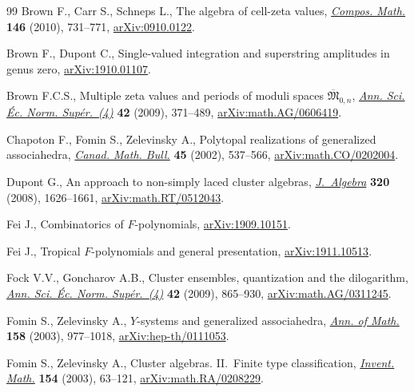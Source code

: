 \documentclass[10pt,a4paper]{amsart}
\numberwithin{equation}{section}
\begin{document}
\begin{thebibliography}{99}
Brown F., Carr S., Schneps L., The algebra of cell-zeta values, \href{https://doi.org/10.1112/S0010437X09004540}{\textit{Compos.
 Math.}} \textbf{146} (2010), 731--771, \href{https://arxiv.org/abs/0910.0122}{arXiv:0910.0122}.

Brown F., Dupont C., Single-valued integration and superstring amplitudes in
 genus zero, \href{https://arxiv.org/abs/1910.01107}{arXiv:1910.01107}.

Brown F.C.S., Multiple zeta values and periods of moduli spaces
 {$\overline{\mathfrak M}_{0,n}$}, \href{https://doi.org/10.24033/asens.2099}{\textit{Ann. Sci. \'Ec. Norm. Sup\'er.~(4)}}
 \textbf{42} (2009), 371--489, \href{https://arxiv.org/abs/math.AG/0606419}{arXiv:math.AG/0606419}.

Chapoton F., Fomin S., Zelevinsky A., Polytopal realizations of generalized
 associahedra, \href{https://doi.org/10.4153/CMB-2002-054-1}{\textit{Canad. Math. Bull.}} \textbf{45} (2002), 537--566, \href{https://arxiv.org/abs/math.CO/0202004}{arXiv:math.CO/0202004}.

Dupont G., An approach to non-simply laced cluster algebras,
 \href{https://doi.org/10.1016/j.jalgebra.2008.03.018}{\textit{J.~Algebra}} \textbf{320} (2008), 1626--1661,
 \href{https://arxiv.org/abs/math.RT/0512043}{arXiv:math.RT/0512043}.

Fei J., Combinatorics of {$F$}-polynomials, \href{https://arxiv.org/abs/1909.10151}{arXiv:1909.10151}.

Fei J., Tropical {$F$}-polynomials and general presentation,
 \href{https://arxiv.org/abs/1911.10513}{arXiv:1911.10513}.

Fock V.V., Goncharov A.B., Cluster ensembles, quantization and the dilogarithm,
 \href{https://doi.org/10.24033/asens.2112}{\textit{Ann. Sci. \'Ec. Norm. Sup\'er.~(4)}} \textbf{42} (2009), 865--930,
 \href{https://arxiv.org/abs/math.AG/0311245}{arXiv:math.AG/0311245}.

Fomin S., Zelevinsky A., {$Y$}-systems and generalized associahedra,
 \href{https://doi.org/10.4007/annals.2003.158.977}{\textit{Ann. of Math.}} \textbf{158} (2003), 977--1018,
 \href{https://arxiv.org/abs/hep-th/0111053}{arXiv:hep-th/0111053}.

Fomin S., Zelevinsky A., Cluster algebras. {II}.~{F}inite type classification,
 \href{https://doi.org/10.1007/s00222-003-0302-y}{\textit{Invent. Math.}} \textbf{154} (2003), 63--121,
 \href{https://arxiv.org/abs/math.RA/0208229}{arXiv:math.RA/0208229}.


\end{thebibliography}
\end{document}
